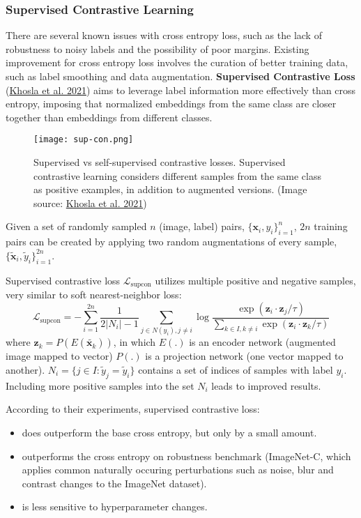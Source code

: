 \documentclass[12pt]{article}
\begin{document}
\subsubsection{Supervised Contrastive Learning}
There are several known issues with cross entropy loss, such as the lack of robustness to noisy labels and the possibility of poor margins. Existing improvement for cross entropy loss involves the curation of better training data, such as label smoothing and data augmentation. \textbf{Supervised Contrastive Loss} (\href{https://arxiv.org/abs/2004.11362}{Khosla et al. 2021}) aims to leverage label information more effectively than cross entropy, imposing that normalized embeddings from the same class are closer together than embeddings from different classes.

\begin{figure}[H]
    \centering
    \texttt{[image: sup-con.png]}
    \caption{Supervised vs self-supervised contrastive losses. Supervised contrastive learning considers different samples from the same class as positive examples, in addition to augmented versions. (Image source: \href{https://arxiv.org/abs/2004.11362}{Khosla et al. 2021})}
\end{figure}

Given a set of randomly sampled $n$ (image, label) pairs, $\{\mathbf{x}_i, y_i\}_{i=1}^n$, $2n$ training pairs can be created by applying two random augmentations of every sample, $\{\tilde{\mathbf{x}}_i, \tilde{y}_i\}_{i=1}^{2n}$.

Supervised contrastive loss $\mathcal{L}_\text{supcon}$ utilizes multiple positive and negative samples, very similar to soft nearest-neighbor loss:
\[
\mathcal{L}_\text{supcon} = - \sum_{i=1}^{2n} \frac{1}{2 \vert N_i \vert - 1} \sum_{j \in N(y_i), j \neq i} \log \frac{\exp(\mathbf{z}_i \cdot \mathbf{z}_j / \tau)}{\sum_{k \in I, k \neq i}\exp({\mathbf{z}_i \cdot \mathbf{z}_k / \tau})}
\]
where $\mathbf{z}_k=P(E(\tilde{\mathbf{x}_k}))$, in which $E(.)$ is an encoder network (augmented image mapped to vector) $P(.)$ is a projection network (one vector mapped to another). $N_i= \{j \in I: \tilde{y}_j = \tilde{y}_i \}$ contains a set of indices of samples with label $y_i$. Including more positive samples into the set $N_i$ leads to improved results.

According to their experiments, supervised contrastive loss:
\begin{itemize}
    \item does outperform the base cross entropy, but only by a small amount.
    \item outperforms the cross entropy on robustness benchmark (ImageNet-C, which applies common naturally occuring perturbations such as noise, blur and contrast changes to the ImageNet dataset).
    \item is less sensitive to hyperparameter changes.
\end{itemize}
\end{document}
